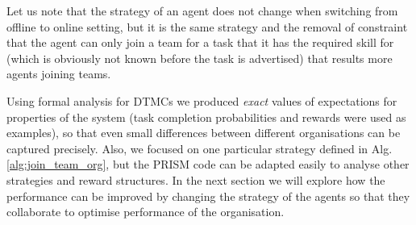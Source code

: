 \documentclass{llncs}
\begin{document}
\begin{table}[H]
 \centering
{}
\caption{Task completion probabilities for optimal agent organisations using Alg.~\ref{alg:join_team_org}'s offline and online versions (see Alg.~\ref{alg:main_process}).}
\label{tab:task_compl_dtmc}
\end{table}

Let us note that the strategy of an agent does not change when switching from offline to online setting, but it is the same strategy and the removal of constraint that the agent can only join a team for a task that it has the required skill for (which is obviously not known before the task is advertised) that results more agents joining teams.

Using formal analysis for DTMCs we produced \emph{exact} values of expectations for properties of the system (task completion probabilities and rewards were used as examples), so that even small differences between different organisations can be captured precisely.
Also, we focused on one particular strategy defined in Alg. \ref{alg:join_team_org}, but the PRISM code can be adapted easily to analyse other strategies and reward structures.
In the next section we will explore how the performance can be improved by changing the strategy of the agents so that they collaborate to optimise performance of the organisation.
\end{document}
